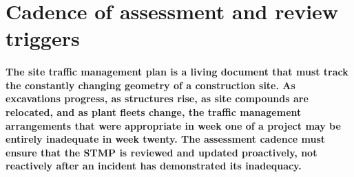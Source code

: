 \section{Cadence of assessment and review triggers}

\paragraph{The site traffic management plan is a living document that must track the constantly changing geometry of a construction site. As excavations progress, as structures rise, as site compounds are relocated, and as plant fleets change, the traffic management arrangements that were appropriate in week one of a project may be entirely inadequate in week twenty. The assessment cadence must ensure that the STMP is reviewed and updated proactively, not reactively after an incident has demonstrated its inadequacy.}

